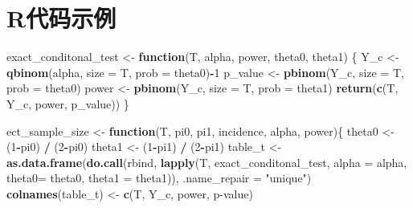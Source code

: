 \documentclass[
]{book}
\newenvironment{Shaded}{\begin{snugshade}}{\end{snugshade}}
\newcommand{\AttributeTok}[1]{\textcolor[rgb]{0.13,0.29,0.53}{#1}}
\newcommand{\ControlFlowTok}[1]{\textcolor[rgb]{0.13,0.29,0.53}{\textbf{#1}}}
\newcommand{\DecValTok}[1]{\textcolor[rgb]{0.00,0.00,0.81}{#1}}
\newcommand{\FunctionTok}[1]{\textcolor[rgb]{0.13,0.29,0.53}{\textbf{#1}}}
\newcommand{\NormalTok}[1]{#1}
\newcommand{\OtherTok}[1]{\textcolor[rgb]{0.56,0.35,0.01}{#1}}
\newcommand{\SpecialCharTok}[1]{\textcolor[rgb]{0.81,0.36,0.00}{\textbf{#1}}}
\newcommand{\StringTok}[1]{\textcolor[rgb]{0.31,0.60,0.02}{#1}}
\begin{document}
\section{R代码示例}\label{rux4ee3ux7801ux793aux4f8b}

\begin{Shaded}
\begin{Highlighting}[]
\NormalTok{exact\_conditonal\_test }\OtherTok{\textless{}{-}} \ControlFlowTok{function}\NormalTok{(T, alpha, power, theta0, theta1) \{}
\NormalTok{  Y\_c }\OtherTok{\textless{}{-}} \FunctionTok{qbinom}\NormalTok{(alpha, }\AttributeTok{size =}\NormalTok{ T, }\AttributeTok{prob =}\NormalTok{ theta0)}\SpecialCharTok{{-}}\DecValTok{1}
\NormalTok{  p\_value }\OtherTok{\textless{}{-}} \FunctionTok{pbinom}\NormalTok{(Y\_c, }\AttributeTok{size =}\NormalTok{ T, }\AttributeTok{prob =}\NormalTok{ theta0)}
\NormalTok{  power }\OtherTok{\textless{}{-}} \FunctionTok{pbinom}\NormalTok{(Y\_c, }\AttributeTok{size =}\NormalTok{ T, }\AttributeTok{prob =}\NormalTok{ theta1)}
  \FunctionTok{return}\NormalTok{(}\FunctionTok{c}\NormalTok{(T, Y\_c, power, p\_value))}
\NormalTok{\}}

\NormalTok{ect\_sample\_size }\OtherTok{\textless{}{-}} \ControlFlowTok{function}\NormalTok{(T, pi0, pi1, incidence, alpha, power)\{}
\NormalTok{  theta0 }\OtherTok{\textless{}{-}}\NormalTok{ (}\DecValTok{1}\SpecialCharTok{{-}}\NormalTok{pi0) }\SpecialCharTok{/}\NormalTok{ (}\DecValTok{2}\SpecialCharTok{{-}}\NormalTok{pi0)}
\NormalTok{  theta1 }\OtherTok{\textless{}{-}}\NormalTok{ (}\DecValTok{1}\SpecialCharTok{{-}}\NormalTok{pi1) }\SpecialCharTok{/}\NormalTok{ (}\DecValTok{2}\SpecialCharTok{{-}}\NormalTok{pi1)}
\NormalTok{  table\_t }\OtherTok{\textless{}{-}} \FunctionTok{as.data.frame}\NormalTok{(}\FunctionTok{do.call}\NormalTok{(rbind, }
                               \FunctionTok{lapply}\NormalTok{(T, exact\_conditonal\_test, }\AttributeTok{alpha =}\NormalTok{ alpha, }\AttributeTok{theta0=}\NormalTok{ theta0, }\AttributeTok{theta1 =}\NormalTok{ theta1)), }\AttributeTok{.name\_repair =} \StringTok{"unique"}\NormalTok{)}
  \FunctionTok{colnames}\NormalTok{(table\_t) }\OtherTok{\textless{}{-}} \FunctionTok{c}\NormalTok{(}\StringTok{\textquotesingle{}T\textquotesingle{}}\NormalTok{, }\StringTok{\textquotesingle{}Y\_c\textquotesingle{}}\NormalTok{, }\StringTok{\textquotesingle{}power\textquotesingle{}}\NormalTok{, }\StringTok{\textquotesingle{}p{-}value\textquotesingle{}}\NormalTok{)}
  

\end{Highlighting}
\end{Shaded}
\end{document}
